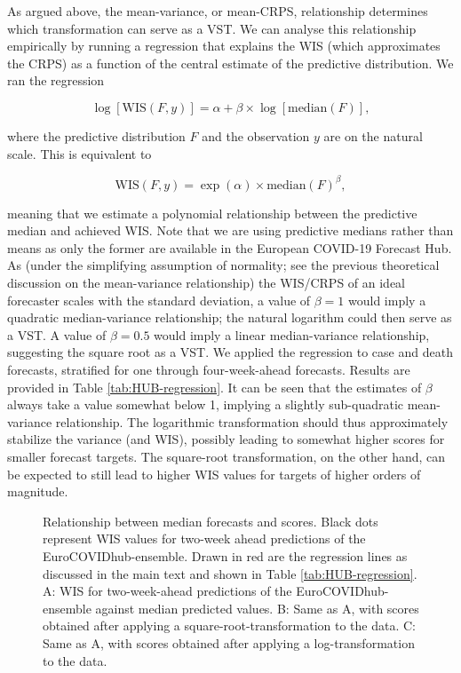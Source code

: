 \documentclass[10pt,letterpaper]{article}
\begin{document}
As argued above, the mean-variance, or mean-CRPS, relationship determines which transformation can serve as a VST. We can analyse this relationship empirically by running a regression that explains the WIS (which approximates the CRPS) as a function of the central estimate of the predictive distribution. We ran the regression
\begin{linenomath*}
\begin{equation}
    \log[\text{WIS}(F, y)] = \alpha + \beta \times \log[\text{median}(F)], 
\end{equation}
\end{linenomath*}
where the predictive distribution $F$ and the observation $y$ are on the natural scale. This is equivalent to
\begin{linenomath*}
\begin{equation}
    \text{WIS}(F, y) = \exp(\alpha) \times \text{median}(F)^\beta, 
\end{equation}
\end{linenomath*}
meaning that we estimate a polynomial relationship between the predictive median and achieved WIS. Note that we are using predictive medians rather than means as only the former are available in the European COVID-19 Forecast Hub. As (under the simplifying assumption of normality; see the previous theoretical discussion on the mean-variance relationship) the WIS/CRPS of an ideal forecaster scales with the standard deviation, a value of $\beta = 1$ would imply a quadratic median-variance relationship; the natural logarithm could then serve as a VST. A value of $\beta = 0.5$ would imply a linear median-variance relationship, suggesting the square root as a VST. We applied the regression to case and death forecasts, stratified for one through four-week-ahead forecasts. Results are provided in Table \ref{tab:HUB-regression}. It can be seen that the estimates of $\beta$ always take a value somewhat below 1, implying a slightly sub-quadratic mean-variance relationship. The logarithmic transformation should thus approximately stabilize the variance (and WIS), possibly leading to somewhat higher scores for smaller forecast targets. The square-root transformation, on the other hand, can be expected to still lead to higher WIS values for targets of higher orders of magnitude.

\begin{figure}[h!]
    \centering
    \caption{Relationship between median forecasts and scores. Black dots represent WIS values for two-week ahead predictions of the EuroCOVIDhub-ensemble. Drawn in red are the regression lines as discussed in the main text and shown in Table \ref{tab:HUB-regression}. A: WIS for two-week-ahead predictions of the EuroCOVIDhub-ensemble against median predicted values. B: Same as A, with scores obtained after applying a square-root-transformation to the data. C: Same as A, with scores obtained after applying a log-transformation to the data.} 
    \label{fig:HUB-regression}
\end{figure}
\end{document}
